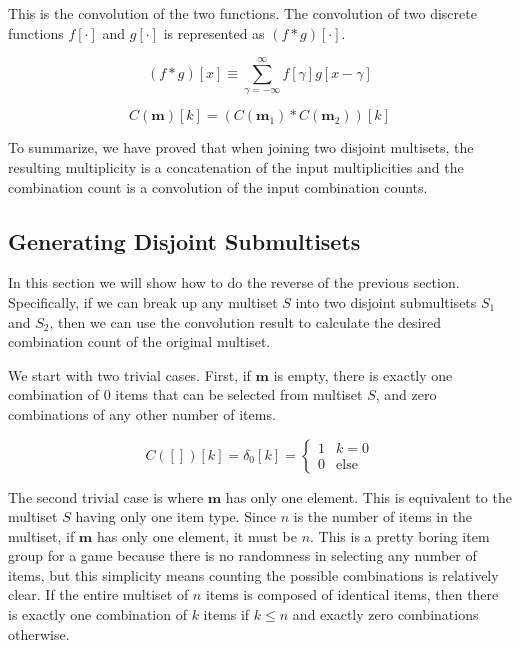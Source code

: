 \documentclass{article}
\begin{document}
This is the convolution of the two functions. The convolution of two discrete functions $f[\cdot]$ and $g[\cdot]$ is represented as $(f * g)[\cdot]$.


\begin{equation}
     (f * g)[x] \equiv \sum_{\gamma=-\infty}^{\infty} f[\gamma]g[x - \gamma]
\end{equation}

\begin{equation}
    C(\bm{m})[k] = (C(\bm{m}_1) * C(\bm{m}_2))[k]
\end{equation}

To summarize, we have proved that when joining two disjoint multisets, the resulting multiplicity is a concatenation of the input multiplicities and the combination count is a convolution of the input combination counts.

\subsection{Generating Disjoint Submultisets}

In this section we will show how to do the reverse of the previous section. Specifically, if we can break up any multiset $S$ into two disjoint submultisets $S_1$ and $S_2$, then we can use the convolution result to calculate the desired combination count of the original multiset.

We start with two trivial cases. First, if $\bm{m}$ is empty, there is exactly one combination of $0$ items that can be selected from multiset $S$, and zero combinations of any other number of items.

\begin{equation}
    C([])[k] = \delta_0[k] = \begin{cases}1 & k = 0 \\ 0 & \text{else}  \end{cases}
\end{equation}

The second trivial case is where $\bm{m}$ has only one element. This is equivalent to the multiset $S$ having only one item type. Since $n$ is the number of items in the multiset, if $\bm{m}$ has only one element, it must be $n$. This is a pretty boring item group for a game because there is no randomness in selecting any number of items, but this simplicity means counting the possible combinations is relatively clear. If the entire multiset of $n$ items is composed of identical items, then there is exactly one combination of $k$ items if $k\leq n$ and exactly zero combinations otherwise.
\end{document}
